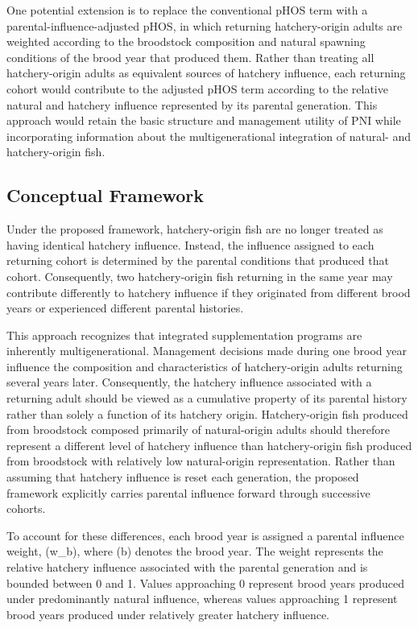 \documentclass[12pt,letterpaper]{article}
\begin{document}
One potential extension is to replace the conventional pHOS term with a parental-influence-adjusted pHOS, in which returning hatchery-origin adults are weighted according to the broodstock composition and natural spawning conditions of the brood year that produced them. Rather than treating all hatchery-origin adults as equivalent sources of hatchery influence, each returning cohort would contribute to the adjusted pHOS term according to the relative natural and hatchery influence represented by its parental generation. This approach would retain the basic structure and management utility of PNI while incorporating information about the multigenerational integration of natural- and hatchery-origin fish.

\subsection{Conceptual Framework}\label{conceptual-framework}

Under the proposed framework, hatchery-origin fish are no longer treated as having identical hatchery influence. Instead, the influence assigned to each returning cohort is determined by the parental conditions that produced that cohort. Consequently, two hatchery-origin fish returning in the same year may contribute differently to hatchery influence if they originated from different brood years or experienced different parental histories.

This approach recognizes that integrated supplementation programs are inherently multigenerational. Management decisions made during one brood year influence the composition and characteristics of hatchery-origin adults returning several years later. Consequently, the hatchery influence associated with a returning adult should be viewed as a cumulative property of its parental history rather than solely a function of its hatchery origin. Hatchery-origin fish produced from broodstock composed primarily of natural-origin adults should therefore represent a different level of hatchery influence than hatchery-origin fish produced from broodstock with relatively low natural-origin representation. Rather than assuming that hatchery influence is reset each generation, the proposed framework explicitly carries parental influence forward through successive cohorts.

To account for these differences, each brood year is assigned a parental influence weight, (w\_b), where (b) denotes the brood year. The weight represents the relative hatchery influence associated with the parental generation and is bounded between 0 and 1. Values approaching 0 represent brood years produced under predominantly natural influence, whereas values approaching 1 represent brood years produced under relatively greater hatchery influence.
\end{document}
